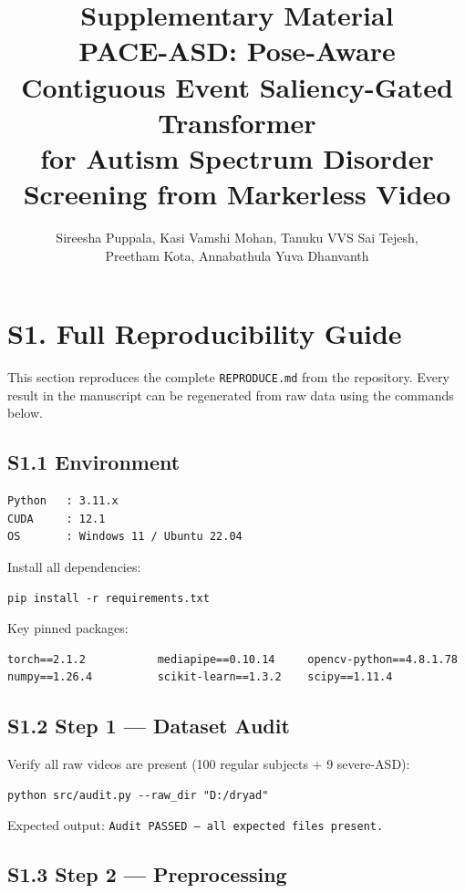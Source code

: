 \documentclass[12pt,a4paper]{article}
\title{\textbf{Supplementary Material}\\[0.5em]
\large PACE-ASD: Pose-Aware Contiguous Event Saliency-Gated Transformer\\
for Autism Spectrum Disorder Screening from Markerless Video}
\author{Sireesha Puppala, Kasi Vamshi Mohan, Tanuku VVS Sai Tejesh,\\
Preetham Kota, Annabathula Yuva Dhanvanth}
\date{}
\begin{document}
\maketitle
\tableofcontents
\vspace{2em}

\section{S1. Full Reproducibility Guide}
\label{sec:s1}

This section reproduces the complete \texttt{REPRODUCE.md} from the repository.
Every result in the manuscript can be regenerated from raw data using the
commands below.

\subsection{S1.1 Environment}

\begin{verbatim}
Python   : 3.11.x
CUDA     : 12.1
OS       : Windows 11 / Ubuntu 22.04
\end{verbatim}

Install all dependencies:
\begin{verbatim}
pip install -r requirements.txt
\end{verbatim}

Key pinned packages:
\begin{verbatim}
torch==2.1.2           mediapipe==0.10.14     opencv-python==4.8.1.78
numpy==1.26.4          scikit-learn==1.3.2    scipy==1.11.4
\end{verbatim}

\subsection{S1.2 Step 1 --- Dataset Audit}

Verify all raw videos are present (100 regular subjects + 9 severe-ASD):
\begin{verbatim}
python src/audit.py --raw_dir "D:/dryad"
\end{verbatim}
Expected output: \texttt{Audit PASSED --- all expected files present.}

\subsection{S1.3 Step 2 --- Preprocessing}
\end{document}
